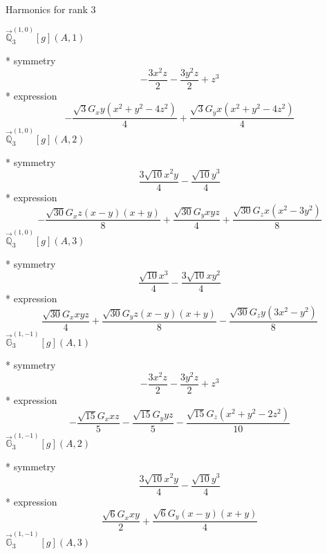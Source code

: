 \documentclass[fleqn,8pt]{jsarticle}
\begin{document}
\noindent * Harmonics for rank 3

\noindent\quad $\vec{\mathbb{Q}}_{3}^{(1,0)}[g](A,1)$

\noindent\quad ** symmetry
\begin{dmath*}
- \frac{3 x^{2} z}{2} - \frac{3 y^{2} z}{2} + z^{3}
\end{dmath*}
\noindent\quad ** expression
\begin{dmath*}
- \frac{\sqrt{3} G_{x} y \left(x^{2} + y^{2} - 4 z^{2}\right)}{4} + \frac{\sqrt{3} G_{y} x \left(x^{2} + y^{2} - 4 z^{2}\right)}{4}
\end{dmath*}
\noindent\quad $\vec{\mathbb{Q}}_{3}^{(1,0)}[g](A,2)$

\noindent\quad ** symmetry
\begin{dmath*}
\frac{3 \sqrt{10} x^{2} y}{4} - \frac{\sqrt{10} y^{3}}{4}
\end{dmath*}
\noindent\quad ** expression
\begin{dmath*}
- \frac{\sqrt{30} G_{x} z \left(x - y\right) \left(x + y\right)}{8} + \frac{\sqrt{30} G_{y} x y z}{4} + \frac{\sqrt{30} G_{z} x \left(x^{2} - 3 y^{2}\right)}{8}
\end{dmath*}
\noindent\quad $\vec{\mathbb{Q}}_{3}^{(1,0)}[g](A,3)$

\noindent\quad ** symmetry
\begin{dmath*}
\frac{\sqrt{10} x^{3}}{4} - \frac{3 \sqrt{10} x y^{2}}{4}
\end{dmath*}
\noindent\quad ** expression
\begin{dmath*}
\frac{\sqrt{30} G_{x} x y z}{4} + \frac{\sqrt{30} G_{y} z \left(x - y\right) \left(x + y\right)}{8} - \frac{\sqrt{30} G_{z} y \left(3 x^{2} - y^{2}\right)}{8}
\end{dmath*}
\noindent\quad $\vec{\mathbb{G}}_{3}^{(1,-1)}[g](A,1)$

\noindent\quad ** symmetry
\begin{dmath*}
- \frac{3 x^{2} z}{2} - \frac{3 y^{2} z}{2} + z^{3}
\end{dmath*}
\noindent\quad ** expression
\begin{dmath*}
- \frac{\sqrt{15} G_{x} x z}{5} - \frac{\sqrt{15} G_{y} y z}{5} - \frac{\sqrt{15} G_{z} \left(x^{2} + y^{2} - 2 z^{2}\right)}{10}
\end{dmath*}
\noindent\quad $\vec{\mathbb{G}}_{3}^{(1,-1)}[g](A,2)$

\noindent\quad ** symmetry
\begin{dmath*}
\frac{3 \sqrt{10} x^{2} y}{4} - \frac{\sqrt{10} y^{3}}{4}
\end{dmath*}
\noindent\quad ** expression
\begin{dmath*}
\frac{\sqrt{6} G_{x} x y}{2} + \frac{\sqrt{6} G_{y} \left(x - y\right) \left(x + y\right)}{4}
\end{dmath*}
\noindent\quad $\vec{\mathbb{G}}_{3}^{(1,-1)}[g](A,3)$
\end{document}
